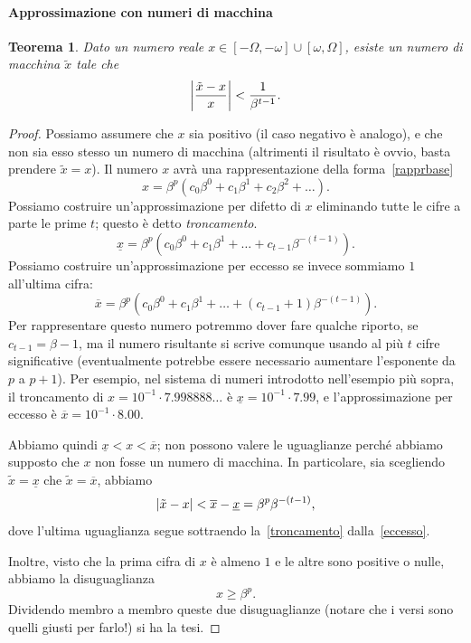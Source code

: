 \documentclass[a4paper]{report}
\DeclarePairedDelimiter{\abs}{\lvert}{\rvert}
\newtheorem{theorem}{Teorema}[chapter]
\theoremstyle{definition}
\theoremstyle{remark}
\begin{document}
\paragraph{Approssimazione con numeri di macchina}
\begin{theorem} \label{th:precmacchina} Dato un numero reale $x \in [-\Omega, -\omega] \cup [\omega, \Omega]$, esiste un numero di macchina $\tilde{x}$ tale che
\begin{equation} \label{roundingerror}
    \abs*{\frac{\tilde{x}-x}{x}} < \frac{1}{\beta^{t-1}}.
\end{equation}
\end{theorem}
\begin{proof}
Possiamo assumere che $x$ sia positivo (il caso negativo è analogo), e che non sia esso stesso un numero di macchina (altrimenti il risultato è ovvio, basta prendere $\tilde{x}=x$). Il numero $x$ avrà una rappresentazione della forma~\eqref{rapprbase}
\[
x = \beta^p (c_0 \beta^0 + c_1 \beta^1 + c_2 \beta^2 + \dots).
\]
Possiamo costruire un'approssimazione per difetto di $x$ eliminando tutte le cifre a parte le prime $t$; questo è detto \emph{troncamento}.
\begin{equation} \label{troncamento}
    \underline{x} = \beta^p (c_0 \beta^0 + c_1 \beta^1 + \dots + c_{t-1} \beta^{-(t-1)}).
\end{equation}
Possiamo costruire un'approssimazione per eccesso se invece sommiamo $1$ all'ultima cifra:
\begin{equation} \label{eccesso}
    \overline{x} = \beta^p (c_0 \beta^0 + c_1 \beta^1 + \dots + (c_{t-1}+1) \beta^{-(t-1)}).
\end{equation}
Per rappresentare questo numero potremmo dover fare qualche riporto, se $c_{t-1}=\beta-1$, ma il numero risultante si scrive comunque usando al più $t$ cifre significative (eventualmente potrebbe essere necessario aumentare l'esponente da $p$ a $p+1$). Per esempio, nel sistema di numeri introdotto nell'esempio più sopra, il troncamento di $x = 10^{-1} \cdot 7.998888\dots$ è $\underline{x} = 10^{-1} \cdot 7.99$, e l'approssimazione per eccesso è $\overline{x} = 10^{-1} \cdot 8.00$.

Abbiamo quindi $\underline{x} < x < \overline{x}$; non possono valere le uguaglianze perché abbiamo supposto che $x$ non fosse un numero di macchina. In particolare, sia scegliendo $\tilde{x} = \underline{x}$ che $\tilde{x} = \overline{x}$, abbiamo
\[
\abs{\tilde{x}-x} < \overline{x}-\underline{x} = \beta^p \beta^{-(t-1)},
\]
dove l'ultima uguaglianza segue sottraendo la~\eqref{troncamento} dalla~\eqref{eccesso}. 

Inoltre, visto che la prima cifra di $x$ è almeno $1$ e le altre sono positive o nulle, abbiamo la disuguaglianza
\begin{equation}
    x \geq \beta^{p}.
\end{equation}
Dividendo membro a membro queste due disuguaglianze (notare che i versi sono quelli giusti per farlo!) si ha la tesi.
\end{proof}
\end{document}
